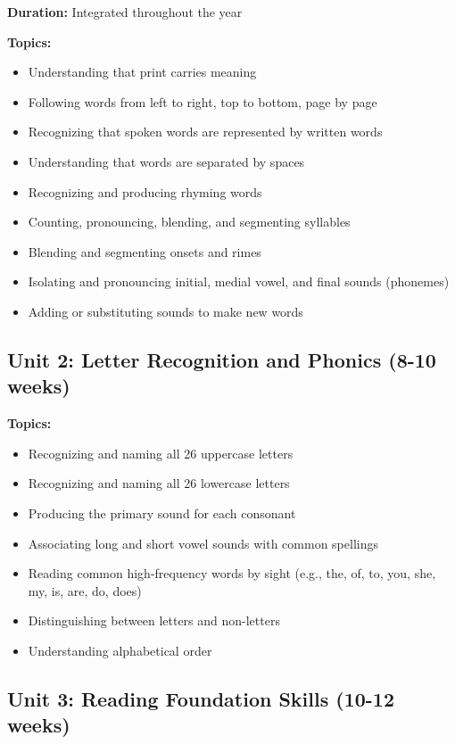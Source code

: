 \documentclass[11pt,letterpaper]{report}
\begin{document}
\textbf{Duration:} Integrated throughout the year

\textbf{Topics:}
\begin{itemize}
    \item Understanding that print carries meaning
    \item Following words from left to right, top to bottom, page by page
    \item Recognizing that spoken words are represented by written words
    \item Understanding that words are separated by spaces
    \item Recognizing and producing rhyming words
    \item Counting, pronouncing, blending, and segmenting syllables
    \item Blending and segmenting onsets and rimes
    \item Isolating and pronouncing initial, medial vowel, and final sounds (phonemes)
    \item Adding or substituting sounds to make new words
\end{itemize}

\subsection{Unit 2: Letter Recognition and Phonics (8-10 weeks)}

\textbf{Topics:}
\begin{itemize}
    \item Recognizing and naming all 26 uppercase letters
    \item Recognizing and naming all 26 lowercase letters
    \item Producing the primary sound for each consonant
    \item Associating long and short vowel sounds with common spellings
    \item Reading common high-frequency words by sight (e.g., the, of, to, you, she, my, is, are, do, does)
    \item Distinguishing between letters and non-letters
    \item Understanding alphabetical order
\end{itemize}

\subsection{Unit 3: Reading Foundation Skills (10-12 weeks)}
\end{document}

